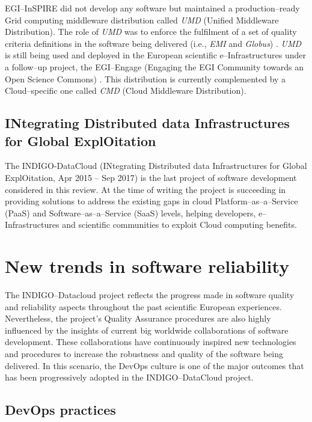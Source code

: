 \documentclass[journal]{IEEEtran}
\begin{document}
EGI--InSPIRE did not
develop any software but maintained a production--ready Grid computing
middleware distribution called {\sl UMD} (Unified Middleware Distribution).
The role of {\sl UMD} was to enforce the fulfilment of a set of quality
criteria definitions \cite{egi-qc} in the software being delivered (i.e.,
{\sl EMI} and {\sl Globus}) \cite{mario}. {\sl UMD} is still being used and
deployed in the European scientific e--Infrastructures under a follow--up
project, the EGI--Engage (Engaging the EGI Community towards an Open Science
Commons) \cite{cordis:egi-engage}. This distribution is currently complemented
by a Cloud--specific one called {\sl CMD} (Cloud Middleware Distribution).

\subsection{INtegrating Distributed data Infrastructures for Global
ExplOitation}

The INDIGO-DataCloud (INtegrating Distributed data Infrastructures for Global
ExplOitation, Apr 2015 -- Sep 2017) \cite{cordis:indigo} is the last
project of software development considered in this review. At the time of writing
the project is succeeding in providing solutions to address the existing gaps in
cloud Platform--as--a--Service (PaaS) and Software--as--a--Service (SaaS) levels,
helping developers, e--Infrastructures and scientific communities to exploit
Cloud computing benefits.

\section{New trends in software reliability}
\label{sec:ntsr}

The INDIGO--Datacloud project reflects the progress made in software
quality and reliability aspects throughout the past scientific European
experiences. Nevertheless, the project’s Quality Assurance procedures are also
highly influenced by the insights of current big worldwide collaborations of
software development. These collaborations have continuously inspired new
technologies and procedures to increase the robustness and quality of the
software being delivered. In this scenario, the DevOps culture is one of the
major outcomes that has been progressively adopted in the INDIGO--DataCloud
project.

\subsection{DevOps practices}
\label{sec:devops}
\end{document}
